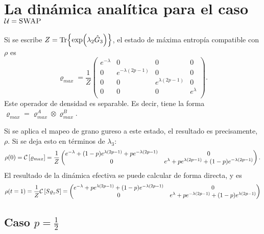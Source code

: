 \section{La dinámica analítica para el caso $\mathcal{U}=\textsc{SWAP}$}

Si se escribe $Z=\Tr{\exp(\lambda_{2}\hat{G}_{3})}$, el estado de máxima entropía compatible con $\rho$ es
\begin{equation}
\varrho_{max}=\frac{1}{Z}\begin{pmatrix}
 e^{-\lambda } & 0 & 0 & 0 \\
 0 & e^{-\lambda  (2 p-1)} & 0 & 0 \\
 0 & 0 & e^{\lambda  (2 p-1)} & 0 \\
 0 & 0 & 0 & e^{\lambda } \\
\end{pmatrix}.
\end{equation}
Este operador de densidad es separable. Es decir, tiene la forma $\varrho_{max}=\varrho_{max}^{A}\otimes\varrho_{max}^{B}$.

Si se aplica el mapeo de grano gureso a este estado, el resultado es precisamente, $\rho$. Si se deja esto en términos de $\lambda_{3}$:
\begin{equation}
\rho(0)=\mathcal{C}\left[\varrho_{max}\right]=\frac{1}{Z}\begin{pmatrix}
 e^{-\lambda }+(1-p)e^{\lambda  (2 p-1)}+p e^{-\lambda  (2 p-1)} & 0 \\
 0 & e^{\lambda }+p e^{\lambda  (2 p-1)}+(1-p)e^{-\lambda  (2 p-1)} \\
\end{pmatrix}.
\end{equation}
El resultado de la dinámica efectiva se puede calcular de forma directa, y es
\begin{equation}
\rho(t=1)=\frac{1}{Z}\mathcal{C}\left[S\varrho_{z} S\right]=
\begin{pmatrix}
 e^{-\lambda }+p e^{\lambda  (2 p-1)}+(1-p) e^{-\lambda  (2 p-1)} & 0 \\
 0 & e^{\lambda }+p e^{-\lambda  (2 p-1)}+(1-p)e^{\lambda  (2 p-1)} \\
\end{pmatrix}
\end{equation}

\subsection{Caso $p=\frac{1}{2}$}

